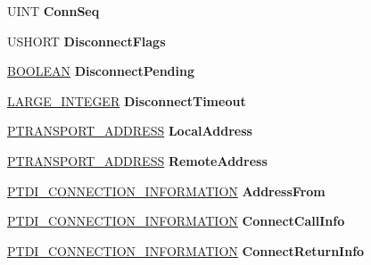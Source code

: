 \begin{DoxyCompactItemize}
U\+I\+NT {\bfseries Conn\+Seq}
\item 
\mbox{\label{struct___a_f_d___f_c_b_aa87b8657f19fc403042f25191ed4fc5a}} 
U\+S\+H\+O\+RT {\bfseries Disconnect\+Flags}
\item 
\mbox{\label{struct___a_f_d___f_c_b_a41c302d5fd6a48e746a5fa3ba0723dd9}} 
\hyperlink{_processor_bind_8h_a112e3146cb38b6ee95e64d85842e380a}{B\+O\+O\+L\+E\+AN} {\bfseries Disconnect\+Pending}
\item 
\mbox{\label{struct___a_f_d___f_c_b_a1e57cf43428bd2dad8cc3fbd17f64b7b}} 
\hyperlink{union___l_a_r_g_e___i_n_t_e_g_e_r}{L\+A\+R\+G\+E\+\_\+\+I\+N\+T\+E\+G\+ER} {\bfseries Disconnect\+Timeout}
\item 
\mbox{\label{struct___a_f_d___f_c_b_ae1f8baff03f976f74b9a917172773607}} 
\hyperlink{struct___t_r_a_n_s_p_o_r_t___a_d_d_r_e_s_s}{P\+T\+R\+A\+N\+S\+P\+O\+R\+T\+\_\+\+A\+D\+D\+R\+E\+SS} {\bfseries Local\+Address}
\item 
\mbox{\label{struct___a_f_d___f_c_b_a395db8a5492ccd8eb7d3a442ff409e3d}} 
\hyperlink{struct___t_r_a_n_s_p_o_r_t___a_d_d_r_e_s_s}{P\+T\+R\+A\+N\+S\+P\+O\+R\+T\+\_\+\+A\+D\+D\+R\+E\+SS} {\bfseries Remote\+Address}
\item 
\mbox{\label{struct___a_f_d___f_c_b_adfa8260a1574af62c7f3de0a393cab99}} 
\hyperlink{struct___t_d_i___c_o_n_n_e_c_t_i_o_n___i_n_f_o_r_m_a_t_i_o_n}{P\+T\+D\+I\+\_\+\+C\+O\+N\+N\+E\+C\+T\+I\+O\+N\+\_\+\+I\+N\+F\+O\+R\+M\+A\+T\+I\+ON} {\bfseries Address\+From}
\item 
\mbox{\label{struct___a_f_d___f_c_b_abf2f1a63d4ce6200a1a4950289a5110e}} 
\hyperlink{struct___t_d_i___c_o_n_n_e_c_t_i_o_n___i_n_f_o_r_m_a_t_i_o_n}{P\+T\+D\+I\+\_\+\+C\+O\+N\+N\+E\+C\+T\+I\+O\+N\+\_\+\+I\+N\+F\+O\+R\+M\+A\+T\+I\+ON} {\bfseries Connect\+Call\+Info}
\item 
\mbox{\label{struct___a_f_d___f_c_b_afffbfd8f6a20934f0d864ed9a79ac815}} 
\hyperlink{struct___t_d_i___c_o_n_n_e_c_t_i_o_n___i_n_f_o_r_m_a_t_i_o_n}{P\+T\+D\+I\+\_\+\+C\+O\+N\+N\+E\+C\+T\+I\+O\+N\+\_\+\+I\+N\+F\+O\+R\+M\+A\+T\+I\+ON} {\bfseries Connect\+Return\+Info}

\end{DoxyCompactItemize}
